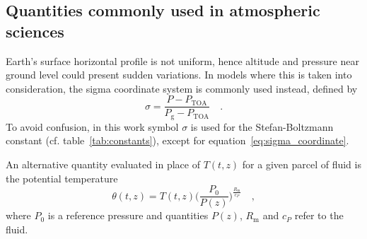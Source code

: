 \documentclass[a4paper,10pt,twocolumn,\classoptions]{article}
\newcommand{\PTOA}{P_\text{TOA}}
\begin{document}
\subsection{Quantities commonly used in atmospheric sciences}
\label{sec:Quantities commonly used in atmospheric sciences}
Earth's surface horizontal profile is not uniform, hence altitude and pressure near ground level could present sudden variations. In models where this is taken into consideration, the sigma coordinate system is commonly used instead, defined by
\begin{equation}
  \label{eq:sigma_coordinate}
  \sigma = \frac{P - \PTOA}{P_\text{g} - \PTOA}
  \quad .
\end{equation}
To avoid confusion, in this work symbol $\sigma$ is used for the Stefan-Boltzmann constant (cf. table~\ref{tab:constants}), except for equation~\eqref{eq:sigma_coordinate}.

An alternative quantity evaluated in place of $T(t,z)$ for a given parcel of fluid is the potential temperature
\begin{equation}
  \label{eq:potential_temperature}
  \theta(t,z) = T(t,z) \bigg( \frac{P_0}{P(z)} \bigg)^\frac{R_\text{m}}{c_P}
  \quad ,
\end{equation}
where $P_0$ is a reference pressure and quantities $P(z)$, $R_\text{m}$ and $c_P$ refer to the fluid.



\newpage
\printbibliography[heading=bibintoc]
\end{document}
